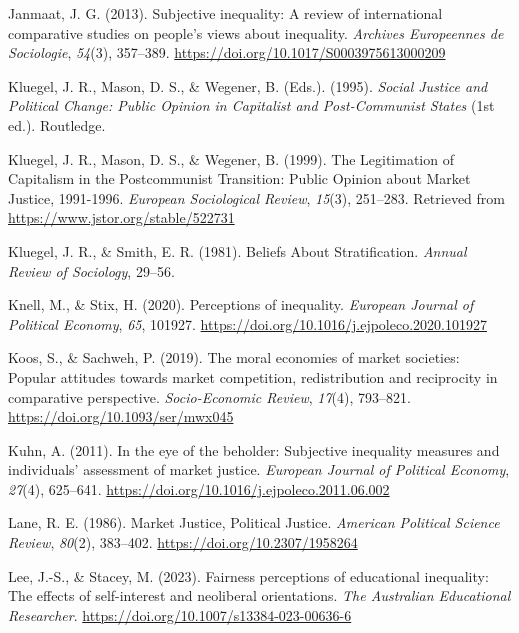 \documentclass[
  12pt,
]{article}
\newlength{\cslhangindent}
\newlength{\cslentryspacingunit} %
\newenvironment{CSLReferences}[2] %
 {%
  \setlength{\parindent}{0pt}
  \ifodd #1
  \let\oldpar\par
  \def\par{\hangindent=\cslhangindent\oldpar}
  \fi
  \setlength{\parskip}{#2\cslentryspacingunit}
 }%
 {}
\begin{document}
\begin{CSLReferences}{1}{0}
\leavevmode{}%
Janmaat, J. G. (2013). Subjective inequality: {A} review of
international comparative studies on people's views about inequality.
\emph{Archives Europeennes de Sociologie}, \emph{54}(3), 357--389.
\url{https://doi.org/10.1017/S0003975613000209}

\leavevmode{}%
Kluegel, J. R., Mason, D. S., \& Wegener, B. (Eds.). (1995).
\emph{Social {Justice} and {Political Change}: {Public Opinion} in
{Capitalist} and {Post-Communist States}} (1st ed.). Routledge.

\leavevmode{}%
Kluegel, J. R., Mason, D. S., \& Wegener, B. (1999). The {Legitimation}
of {Capitalism} in the {Postcommunist Transition}: {Public Opinion}
about {Market Justice}, 1991-1996. \emph{European Sociological Review},
\emph{15}(3), 251--283. Retrieved from
\url{https://www.jstor.org/stable/522731}

\leavevmode{}%
Kluegel, J. R., \& Smith, E. R. (1981). Beliefs {About Stratification}.
\emph{Annual Review of Sociology}, 29--56.

\leavevmode{}%
Knell, M., \& Stix, H. (2020). Perceptions of inequality. \emph{European
Journal of Political Economy}, \emph{65}, 101927.
\url{https://doi.org/10.1016/j.ejpoleco.2020.101927}

\leavevmode{}%
Koos, S., \& Sachweh, P. (2019). The moral economies of market
societies: Popular attitudes towards market competition, redistribution
and reciprocity in comparative perspective. \emph{Socio-Economic
Review}, \emph{17}(4), 793--821.
\url{https://doi.org/10.1093/ser/mwx045}

\leavevmode{}%
Kuhn, A. (2011). In the eye of the beholder: {Subjective} inequality
measures and individuals' assessment of market justice. \emph{European
Journal of Political Economy}, \emph{27}(4), 625--641.
\url{https://doi.org/10.1016/j.ejpoleco.2011.06.002}

\leavevmode{}%
Lane, R. E. (1986). Market {Justice}, {Political Justice}.
\emph{American Political Science Review}, \emph{80}(2), 383--402.
\url{https://doi.org/10.2307/1958264}

\leavevmode{}%
Lee, J.-S., \& Stacey, M. (2023). Fairness perceptions of educational
inequality: The effects of self-interest and neoliberal orientations.
\emph{The Australian Educational Researcher}.
\url{https://doi.org/10.1007/s13384-023-00636-6}


\end{CSLReferences}
\end{document}
